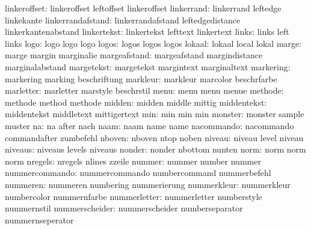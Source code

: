         linkeroffset:  linkeroffset         leftoffset           linkeroffset
          linkerrand:  linkerrand           leftedge             linkekante
   linkerrandafstand:  linkerrandafstand    leftedgedistance     linkerkantenabstand
         linkertekst:  linkertekst          lefttext             linkertext
               links:  links                left                 links
                logo:  logo                 logo                 logo
               logos:  logos                logos                logos
              lokaal:  lokaal               local                lokal
               marge:  marge                margin               marginalie
        margeafstand:  margeafstand         margindistance       marginalabstand
          margetekst:  margetekst           margintext           marginaltext
           markering:  markering            marking              beschriftung
            markleur:  markleur             marcolor             beschrfarbe
           marletter:  marletter            marstyle             beschrstil
                menu:  menu                 menu                 menue
             methode:  methode              method               methode
              midden:  midden               middle               mittig
         middentekst:  middentekst          middletext           mittigertext
                 min:  min                  min                  min
             monster:  monster              sample               muster
                  na:  na                   after                nach
                naam:  naam                 name                 name
          nacommando:  nacommando           commandafter         zumbefehl
              nboven:  nboven               ntop                 noben
              niveau:  niveau               level                niveau
             niveaus:  niveaus              levels               niveaus
              nonder:  nonder               nbottom              nunten
                norm:  norm                 norm                 norm
             nregels:  nregels              nlines               zzeile
              nummer:  nummer               number               nummer
      nummercommando:  nummercommando       numbercommand        nummerbefehl
            nummeren:  nummeren             numbering            nummerierung
         nummerkleur:  nummerkleur          numbercolor          nummernfarbe
        nummerletter:  nummerletter         numberstyle          nummernstil
      nummerscheider:  nummerscheider       numberseparator      nummernseperator
